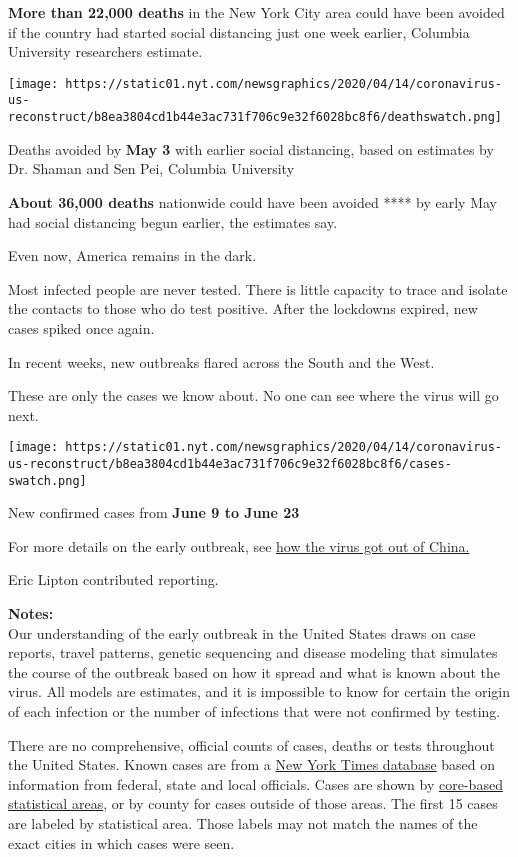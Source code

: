 \textbf{More than 22,000 deaths} in the New York City area could have
been avoided if the country had started social distancing just one week
earlier, Columbia University researchers estimate.

\texttt{[image: https://static01.nyt.com/newsgraphics/2020/04/14/coronavirus-us-reconstruct/b8ea3804cd1b44e3ac731f706c9e32f6028bc8f6/deathswatch.png]}

Deaths avoided by \textbf{May 3} with earlier social distancing, based
on estimates by Dr. Shaman and Sen Pei, Columbia University

\textbf{About 36,000 deaths} nationwide could have been avoided **** by
early May had social distancing begun earlier, the estimates say.

Even now, America remains in the dark.

Most infected people are never tested. There is little capacity to trace
and isolate the contacts to those who do test positive. After the
lockdowns expired, new cases spiked once again.

In recent weeks, new outbreaks flared across the South and the West.

These are only the cases we know about. No one can see where the virus
will go next.

\texttt{[image: https://static01.nyt.com/newsgraphics/2020/04/14/coronavirus-us-reconstruct/b8ea3804cd1b44e3ac731f706c9e32f6028bc8f6/cases-swatch.png]}

New confirmed cases from \textbf{June 9 to June 23}

For more details on the early outbreak, see
\href{https://www.nytimes.com/interactive/2020/03/22/world/coronavirus-spread.html}{how
the virus got out of China.}

Eric Lipton contributed reporting.

\textbf{Notes:}\\
Our understanding of the early outbreak in the United States draws on
case reports, travel patterns, genetic sequencing and disease modeling
that simulates the course of the outbreak based on how it spread and
what is known about the virus. All models are estimates, and it is
impossible to know for certain the origin of each infection or the
number of infections that were not confirmed by testing.

There are no comprehensive, official counts of cases, deaths or tests
throughout the United States. Known cases are from a
\href{https://www.nytimes.com/interactive/2020/us/coronavirus-us-cases.html}{New
York Times database} based on information from federal, state and local
officials. Cases are shown by
\href{https://www.census.gov/topics/housing/housing-patterns/about/core-based-statistical-areas.html}{core-based
statistical areas}, or by county for cases outside of those areas. The
first 15 cases are labeled by statistical area. Those labels may not
match the names of the exact cities in which cases were seen.

